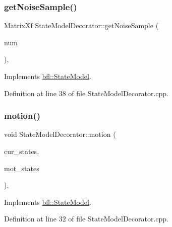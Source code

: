 \subsubsection{\texorpdfstring{get\+Noise\+Sample()}{getNoiseSample()}}
{\footnotesize\ttfamily Matrix\+Xf State\+Model\+Decorator\+::get\+Noise\+Sample (\begin{DoxyParamCaption}\item[{const int}]{num }\end{DoxyParamCaption})\hspace{0.3cm}{\ttfamily [override]}, {\ttfamily [virtual]}}



Implements \mbox{\hyperlink{classbfl_1_1StateModel_ab1f0aa4c804b7de86c68294de3df76ee}{bfl\+::\+State\+Model}}.



Definition at line 38 of file State\+Model\+Decorator.\+cpp.

\mbox{\label{classbfl_1_1StateModelDecorator_a0a645d8be4085ec13d9715a41c84a9b3}} 
\subsubsection{\texorpdfstring{motion()}{motion()}}
{\footnotesize\ttfamily void State\+Model\+Decorator\+::motion (\begin{DoxyParamCaption}\item[{const Eigen\+::\+Ref$<$ const Eigen\+::\+Matrix\+Xf $>$ \&}]{cur\+\_\+states,  }\item[{Eigen\+::\+Ref$<$ Eigen\+::\+Matrix\+Xf $>$}]{mot\+\_\+states }\end{DoxyParamCaption})\hspace{0.3cm}{\ttfamily [override]}, {\ttfamily [virtual]}}



Implements \mbox{\hyperlink{classbfl_1_1StateModel_a3601485697ae3445ec7ca753dbeb035c}{bfl\+::\+State\+Model}}.



Definition at line 32 of file State\+Model\+Decorator.\+cpp.

\mbox{\label{classbfl_1_1StateModelDecorator_a5f7ab9c56ebbf7f653014933d688339b}} 
